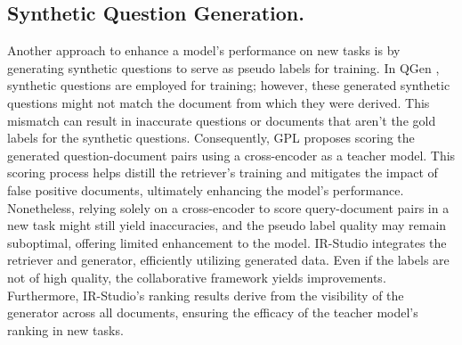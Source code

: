 \subsection{Synthetic Question Generation.}

Another approach to enhance a model's performance on new tasks is by generating synthetic questions to serve as pseudo labels for training. In QGen \cite{ma2020zero}, synthetic questions are employed for training; however, these generated synthetic questions might not match the document from which they were derived. This mismatch can result in inaccurate questions or documents that aren't the gold labels for the synthetic questions. Consequently, GPL \cite{wang2021gpl} proposes scoring the generated question-document pairs using a cross-encoder as a teacher model. This scoring process helps distill the retriever's training and mitigates the impact of false positive documents, ultimately enhancing the model's performance. Nonetheless, relying solely on a cross-encoder to score query-document pairs in a new task might still yield inaccuracies, and the pseudo label quality may remain suboptimal, offering limited enhancement to the model. IR-Studio integrates the retriever and generator, efficiently utilizing generated data. Even if the labels are not of high quality, the collaborative framework yields improvements. Furthermore, IR-Studio's ranking results derive from the visibility of the generator across all documents, ensuring the efficacy of the teacher model's ranking in new tasks.